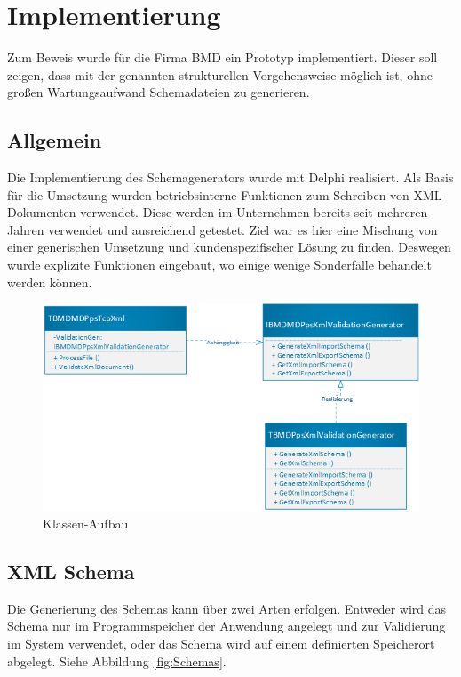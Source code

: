 \chapter{Implementierung}
\label{cha:Implementierung}
Zum Beweis wurde für die Firma BMD ein Prototyp implementiert. 
Dieser soll zeigen, dass mit der genannten strukturellen Vorgehensweise möglich ist, ohne großen Wartungsaufwand Schemadateien zu generieren.


\section{Allgemein}
Die Implementierung des Schemagenerators wurde mit Delphi realisiert. 
Als Basis für die Umsetzung wurden betriebsinterne Funktionen zum Schreiben von XML-Dokumenten verwendet. 
Diese werden im Unternehmen bereits seit mehreren Jahren verwendet und ausreichend getestet.
Ziel war es hier eine Mischung von einer generischen Umsetzung und kundenspezifischer Lösung zu finden. 
Deswegen wurde explizite Funktionen eingebaut, wo einige wenige Sonderfälle behandelt werden können.


\begin{figure}
    \centering
    \includegraphics[width=.95\textwidth]{images/KlassenUML.png}
    \caption{Klassen-Aufbau}
    \label{fig:Klassenaufbau}
\end{figure}

\section{XML Schema}
Die Generierung des Schemas kann über zwei Arten erfolgen. 
Entweder wird das Schema nur im Programmspeicher der Anwendung angelegt und zur Validierung im System verwendet, oder das Schema wird auf einem definierten Speicherort abgelegt. Siehe Abbildung \ref{fig:Schemas}.

